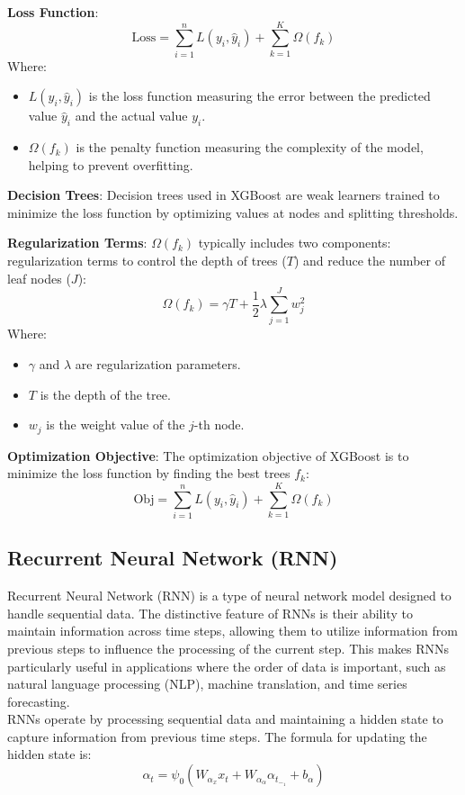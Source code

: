 \documentclass{ieeeojies}
\begin{document}
 \item \textbf{Loss Function}:
        \[ \text{Loss} = \sum_{i=1}^{n} L(y_i, \hat{y}_i) + \sum_{k=1}^{K} \Omega(f_k) \]
        Where:
        \begin{itemize}
            \item $L(y_i, \hat{y}_i)$ is the loss function measuring the error between the predicted value $\hat{y}_i$ and the actual value $y_i$.
            \item $\Omega(f_k)$ is the penalty function measuring the complexity of the model, helping to prevent overfitting.
        \end{itemize}
        
    \item \textbf{Decision Trees}:
        Decision trees used in XGBoost are weak learners trained to minimize the loss function by optimizing values at nodes and splitting thresholds.
        
    \item \textbf{Regularization Terms}:
        $\Omega(f_k)$ typically includes two components: regularization terms to control the depth of trees ($T$) and reduce the number of leaf nodes ($J$):
        \[ \Omega(f_k) = \gamma T + \frac{1}{2} \lambda \sum_{j=1}^{J} w_j^2 \]
        Where:
        \begin{itemize}
            \item $\gamma$ and $\lambda$ are regularization parameters.
            \item $T$ is the depth of the tree.
            \item $w_j$ is the weight value of the $j$-th node.
        \end{itemize}
        
    \item \textbf{Optimization Objective}:
        The optimization objective of XGBoost is to minimize the loss function by finding the best trees $f_k$:
        \[ \text{Obj} = \sum_{i=1}^{n} L(y_i, \hat{y}_i) + \sum_{k=1}^{K} \Omega(f_k) \]

\subsection{Recurrent Neural Network (RNN)}
Recurrent Neural Network (RNN) is a type of neural network model designed to handle sequential data. The distinctive feature of RNNs is their ability to maintain information across time steps, allowing them to utilize information from previous steps to influence the processing of the current step. This makes RNNs particularly useful in applications where the order of data is important, such as natural language processing (NLP), machine translation, and time series forecasting. \\
RNNs operate by processing sequential data and maintaining a hidden state to capture information from previous time steps. The formula for updating the hidden state is:
\[\alpha_t=\psi_0(W_\alpha_xx_t + W_\alpha_\alpha\alpha_t_-_1 + b_\alpha)\]
\end{document}

